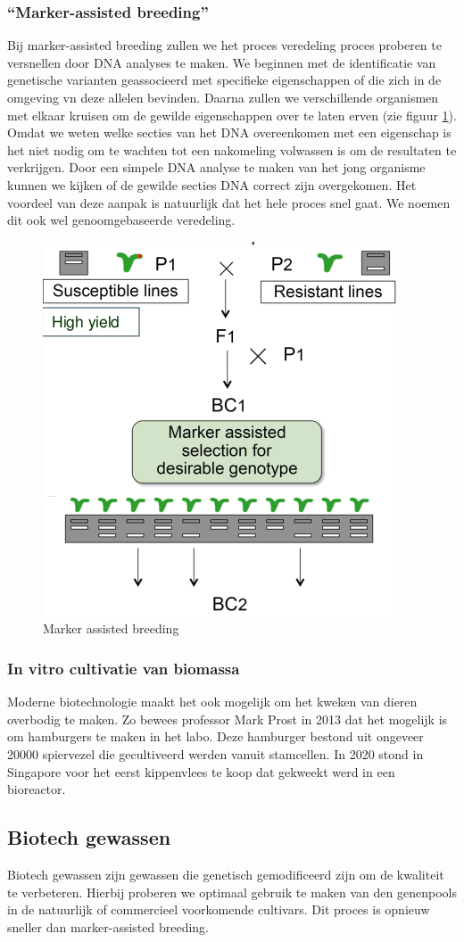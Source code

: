 \documentclass[a4paper,kul]{kulakarticle} %
\begin{document}
\subsubsection{“Marker-assisted breeding”}
Bij marker-assisted breeding zullen we het proces veredeling proces proberen te versnellen door DNA analyses te maken. We beginnen met de identificatie van genetische varianten geassocieerd met specifieke eigenschappen of die zich in de omgeving vn deze allelen bevinden. Daarna zullen we verschillende organismen met elkaar kruisen om de gewilde eigenschappen over te laten erven (zie figuur \ref{fig:markerbreeding}). Omdat we weten welke secties van het DNA overeenkomen met een eigenschap is het niet nodig om te wachten tot een nakomeling volwassen is om de resultaten te verkrijgen. Door een simpele DNA analyse te maken van het jong organisme kunnen we kijken of de gewilde secties DNA correct zijn overgekomen. Het voordeel van deze aanpak is natuurlijk dat het hele proces snel gaat. We noemen dit ook wel genoomgebaseerde veredeling. 
\begin{figure}[h]
	\centering
	\includegraphics[width=0.4\linewidth]{MarkerBreeding}
	\caption[Marker assisted breeding]{Marker assisted breeding}
	\label{fig:markerbreeding}
\end{figure}
\subsubsection{In vitro cultivatie van biomassa} 
Moderne biotechnologie maakt het ook mogelijk om het kweken van dieren overbodig te maken. Zo bewees professor Mark Prost in 2013 dat het mogelijk is om hamburgers te maken in het labo. Deze hamburger bestond uit ongeveer \num{20000} spiervezel die gecultiveerd werden vanuit stamcellen. In 2020 stond in Singapore voor het eerst kippenvlees te koop dat gekweekt werd in een bioreactor. 
\subsection{Biotech gewassen}
Biotech gewassen zijn gewassen die genetisch gemodificeerd zijn om de kwaliteit te verbeteren. Hierbij proberen we optimaal gebruik te maken van den genenpools in de natuurlijk of commercieel voorkomende cultivars. Dit proces is opnieuw sneller dan marker-assisted breeding. 
\end{document}
